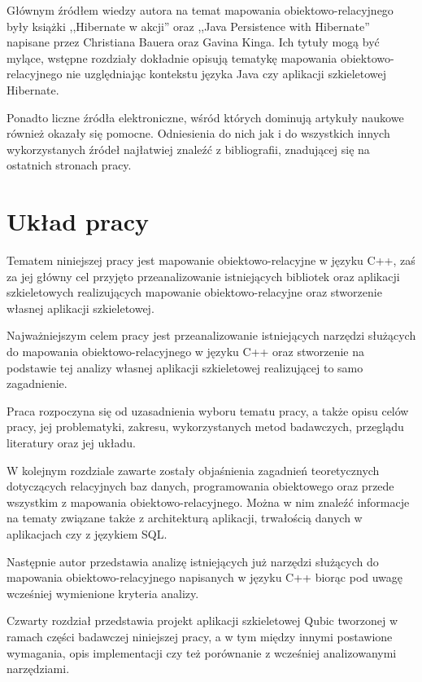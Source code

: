 \documentclass[12pt]{report}
\begin{document}
Głównym źródłem wiedzy autora na temat mapowania obiektowo-relacyjnego były książki ,,Hibernate w akcji'' \cite{hibernate} oraz ,,Java Persistence with Hibernate'' 
\cite{persistence} napisane przez Christiana Bauera oraz Gavina Kinga. Ich tytuły mogą być mylące, wstępne rozdziały dokładnie opisują tematykę mapowania
obiektowo-relacyjnego nie uzglę\-dniając kontekstu języka Java czy aplikacji szkieletowej Hibernate.

Ponadto liczne źródła elektroniczne, wśród których dominują artykuły naukowe również okazały się pomocne. Odniesienia do nich jak i do wszystkich innych wykorzystanych
źródeł najłatwiej znaleźć z bibliografii, znadującej się na ostatnich stronach pracy.

\section{Układ pracy}

Tematem niniejszej pracy jest mapowanie obiektowo-relacyjne w języku C++, zaś za jej główny cel przyjęto przeanalizowanie istniejących bibliotek oraz aplikacji szkieletowych
realizujących mapowanie obiektowo-relacyjne oraz stworzenie własnej aplikacji szkieletowej.

Najważniejszym celem pracy jest przeanalizowanie istniejących narzędzi służą\-cych do mapowania obiektowo-relacyjnego w języku C++ oraz stworzenie na podstawie tej analizy
własnej aplikacji szkieletowej realizującej to samo zagadnienie.

Praca rozpoczyna się od uzasadnienia wyboru tematu pracy, a także opisu celów pracy, jej problematyki, zakresu, wykorzystanych metod badawczych, przeglądu literatury
oraz jej układu.

W kolejnym rozdziale zawarte zostały objaśnienia zagadnień teoretycznych do\-tyczących relacyjnych baz danych, programowania obiektowego oraz przede wszystkim
z mapowania obiektowo-relacyjnego. Można w nim znaleźć informacje na tematy związane także z architekturą aplikacji, trwałością danych w aplikacjach czy z językiem SQL.

Następnie autor przedstawia analizę istniejących już narzędzi służących do mapowania obiektowo-relacyjnego napisanych w języku C++ biorąc pod uwagę wcześniej
wymienione kryteria analizy.

Czwarty rozdział przedstawia projekt aplikacji szkieletowej Qubic tworzonej w ramach części badawczej niniejszej pracy, a w tym między innymi postawione wymagania, 
opis implementacji czy też porównanie z wcześniej analizowanymi narzędziami.
\end{document}
